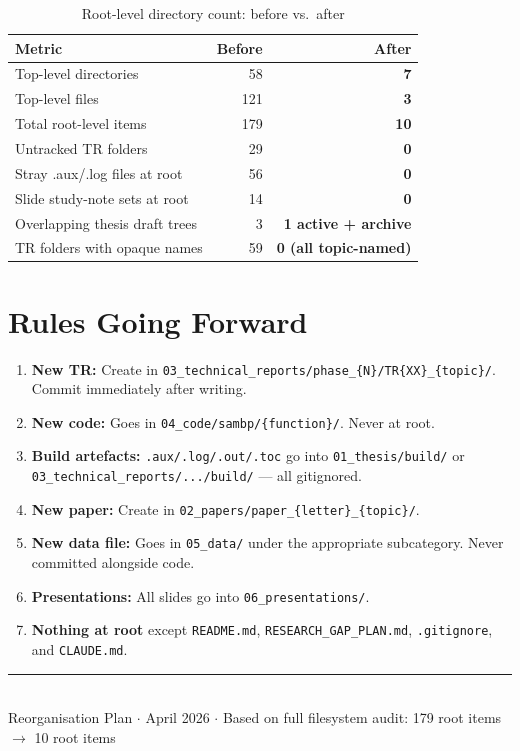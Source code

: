 \documentclass[11pt,a4paper]{article}
\newcommand{\cmd}[1]{\texttt{\small #1}}
\begin{document}
\begin{table}[h!]
\centering
\caption{Root-level directory count: before vs.\ after}
\begin{tabular}{lrr}
\toprule
\textbf{Metric} & \textbf{Before} & \textbf{After} \\
\midrule
Top-level directories & 58 & \textbf{7} \\
Top-level files & 121 & \textbf{3} \\
Total root-level items & 179 & \textbf{10} \\
Untracked TR folders & 29 & \textbf{0} \\
Stray .aux/.log files at root & 56 & \textbf{0} \\
Slide study-note sets at root & 14 & \textbf{0} \\
Overlapping thesis draft trees & 3 & \textbf{1 active + archive} \\
TR folders with opaque names & 59 & \textbf{0 (all topic-named)} \\
\bottomrule
\end{tabular}
\end{table}

\section{Rules Going Forward}

\begin{bluebox}
\begin{enumerate}[leftmargin=1.5cm,label=\textbf{R\arabic*.}]
  \item \textbf{New TR:} Create in \cmd{03\_technical\_reports/phase\_\{N\}/TR\{XX\}\_\{topic\}/}.
    Commit immediately after writing.
  \item \textbf{New code:} Goes in \cmd{04\_code/sambp/\{function\}/}.
    Never at root.
  \item \textbf{Build artefacts:} \cmd{.aux/.log/.out/.toc} go into
    \cmd{01\_thesis/build/} or \cmd{03\_technical\_reports/.../build/} —
    all gitignored.
  \item \textbf{New paper:} Create in \cmd{02\_papers/paper\_\{letter\}\_\{topic\}/}.
  \item \textbf{New data file:} Goes in \cmd{05\_data/} under the appropriate
    subcategory. Never committed alongside code.
  \item \textbf{Presentations:} All slides go into \cmd{06\_presentations/}.
  \item \textbf{Nothing at root} except \cmd{README.md},
    \cmd{RESEARCH\_GAP\_PLAN.md}, \cmd{.gitignore}, and \cmd{CLAUDE.md}.
\end{enumerate}
\end{bluebox}

\vfill
\begin{center}
\rule{0.6\linewidth}{0.4pt}\\[4pt]
{\small Reorganisation Plan $\cdot$ April 2026 $\cdot$
Based on full filesystem audit: 179 root items $\to$ 10 root items}
\end{center}
\end{document}
